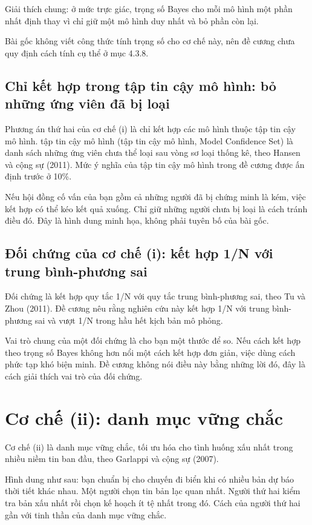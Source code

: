 Giải thích chung: ở mức trực giác, trọng số Bayes cho mỗi mô hình một phần nhất định thay vì chỉ giữ một mô hình duy nhất và bỏ phần còn lại.

Bài gốc không viết công thức tính trọng số cho cơ chế này, nên đề cương chưa quy định cách tính cụ thể ở mục 4.3.8.

\subsection{Chỉ kết hợp trong tập tin cậy mô hình: bỏ những ứng viên đã bị loại}

Phương án thứ hai của cơ chế (i) là chỉ kết hợp các mô hình thuộc tập tin cậy mô hình. tập tin cậy mô hình (tập tin cậy mô hình, Model Confidence Set) là danh sách những ứng viên chưa thể loại sau vòng sơ loại thống kê, theo Hansen và cộng sự (2011). Mức ý nghĩa của tập tin cậy mô hình trong đề cương được ấn định trước ở 10\%.

Nếu hội đồng cố vấn của bạn gồm cả những người đã bị chứng minh là kém, việc kết hợp có thể kéo kết quả xuống. Chỉ giữ những người chưa bị loại là cách tránh điều đó. Đây là hình dung minh họa, không phải tuyên bố của bài gốc.

\subsection{Đối chứng của cơ chế (i): kết hợp 1/N với trung bình-phương sai}

Đối chứng là kết hợp quy tắc 1/N với quy tắc trung bình-phương sai, theo Tu và Zhou (2011). Đề cương nêu rằng nghiên cứu này kết hợp 1/N với trung bình-phương sai và vượt 1/N trong hầu hết kịch bản mô phỏng.

Vai trò chung của một đối chứng là cho bạn một thước để so. Nếu cách kết hợp theo trọng số Bayes không hơn nổi một cách kết hợp đơn giản, việc dùng cách phức tạp khó biện minh. Đề cương không nói điều này bằng những lời đó, đây là cách giải thích vai trò của đối chứng.

\section{Cơ chế (ii): danh mục vững chắc}

Cơ chế (ii) là danh mục vững chắc, tối ưu hóa cho tình huống xấu nhất trong nhiều niềm tin ban đầu, theo Garlappi và cộng sự (2007).

Hình dung như sau: bạn chuẩn bị cho chuyến đi biển khi có nhiều bản dự báo thời tiết khác nhau. Một người chọn tin bản lạc quan nhất. Người thứ hai kiểm tra bản xấu nhất rồi chọn kế hoạch ít tệ nhất trong đó. Cách của người thứ hai gần với tinh thần của danh mục vững chắc.

